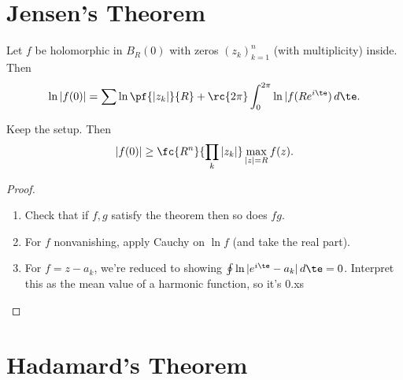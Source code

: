 \def\filepath{C:/Users/Owner/Dropbox/Math/templates}





%


%

\pagestyle{fancy}
\chead{} 
\rhead{} 
\lfoot{} 
\cfoot{\thepage} 
\rfoot{} 
\renewcommand{\headrulewidth}{.3pt} 
\setlength\voffset{0in}
\setlength\textheight{648pt}


\section{Jensen's Theorem}
\begin{thm}
Let $f$ be holomorphic in $B_R(0)$ with zeros $(z_k)_{k=1}^n$ (with multiplicity) inside. Then
\[
\ln |f(0)| = \sum \ln \pf{|z_k|}{R} + \rc{2\pi}\int_0^{2\pi} \ln |f(Re^{i\te})\,d\te.
\]
\end{thm}
\begin{cor}
Keep the setup. Then
\[
|f(0)|\ge \fc{R^n}{\prod_k |z_k|} \max_{|z|=R}f(z).
\]
\end{cor}
\begin{proof}
\begin{enumerate}
\item
Check that if $f,g$ satisfy the theorem then so does $fg$.
\item 
For $f$ nonvanishing, apply Cauchy on $\ln f$ (and take the real part).
\item
For $f=z-a_k$, we're reduced to showing $\oint \ln |e^{i\te}-a_k|\,d\te=0$. Interpret this as the mean value of a harmonic function, so it's 0.xs
\end{enumerate}
\end{proof}

\section{Hadamard's Theorem}

%
 
%
%
